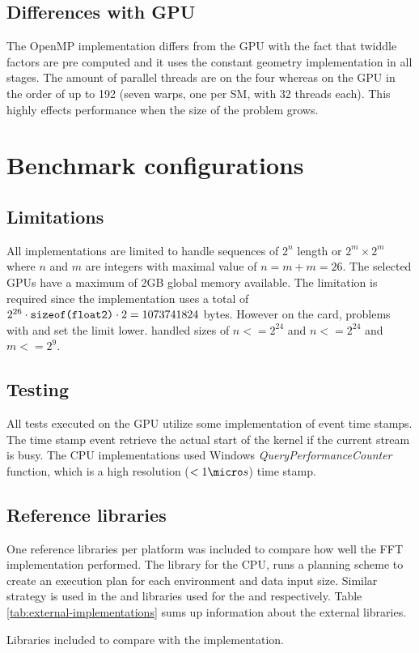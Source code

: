 \subsection{Differences with GPU}

The OpenMP implementation differs from the \gls{GPU} with the fact that twiddle factors are pre computed and it uses the constant geometry implementation in all stages. The amount of parallel threads are on the {\INTELCPU} four whereas on the \gls{GPU} in the order of up to 192 (seven warps, one per \gls{SM}, with 32 threads each). This highly effects performance when the size of the problem grows.

\section{Benchmark configurations}

\subsection{Limitations}

All implementations are limited to handle sequences of $2^n$ length or $2^m \times 2^m$ where $n$ and $m$ are integers with maximal value of $n = m + m = 26$. The selected \gls{GPU}s have a maximum of 2GB global memory available. The limitation is required since the implementation uses a total of $2^{26} \cdot \texttt{sizeof(float2)} \cdot 2 = 1073741824$ bytes. However on the {\AMDCARD} card, problems with {\DX} and {\GL} set the limit lower. {\DX} handled sizes of $n <= 2^{24}$ and {\GL} $n <= 2^{24}$ and $m <= 2^{9}$.

\subsection{Testing}

All tests executed on the \gls{GPU} utilize some implementation of event time stamps. The time stamp event retrieve the actual start of the kernel if the current stream is busy. The \gls{CPU} implementations used Windows \emph{QueryPerformanceCounter} function, which is a high resolution ($<1{\micro}s$) time stamp.

\subsection{Reference libraries}

One reference libraries per platform was included to compare how well the FFT implementation performed. The \emph{\FFTW} library for the \gls{CPU}, runs a planning scheme to create an execution plan for each environment and data input size. Similar strategy is used in the {\CUFFT} and {\CLFFT} libraries used for the {\NVCARD} and {\AMDCARD} respectively. Table \ref{tab:external-implementations} sums up information about the external libraries.

\begin{table}
	\centering
	
	\caption{Libraries included to compare with the implementation.}
	\label{tab:external-implementations}
\end{table}